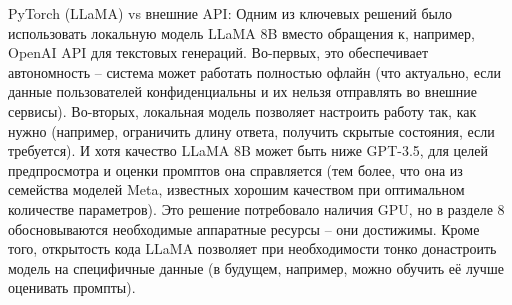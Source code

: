 PyTorch (LLaMA) vs внешние API: Одним из ключевых решений было использовать локальную модель LLaMA 8B вместо обращения к, например, OpenAI API для текстовых генераций. Во-первых, это обеспечивает автономность – система может работать полностью офлайн (что актуально, если данные пользователей конфиденциальны и их нельзя отправлять во внешние сервисы). Во-вторых, локальная модель позволяет настроить работу так, как нужно (например, ограничить длину ответа, получить скрытые состояния, если требуется). И хотя качество LLaMA 8B может быть ниже GPT-3.5, для целей предпросмотра и оценки промптов она справляется (тем более, что она из семейства моделей Meta, известных хорошим качеством при оптимальном количестве параметров)\cite{llama:wiki}. Это решение потребовало наличия GPU, но в разделе 8 обосновываются необходимые аппаратные ресурсы – они достижимы. Кроме того, открытость кода LLaMA позволяет при необходимости тонко донастроить модель на специфичные данные (в будущем, например, можно обучить её лучше оценивать промпты).

